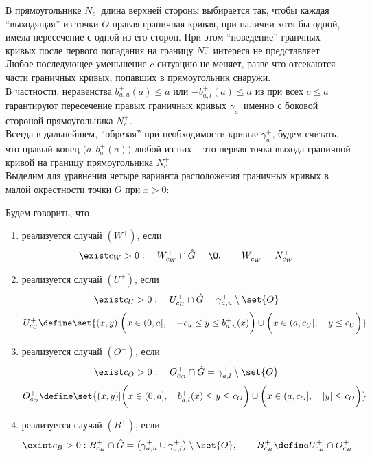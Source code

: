 В прямоугольнике $ N_c^+ $ длина верхней стороны выбирается так, чтобы каждая ``выходящая'' из точки $ O $ правая граничная кривая, при наличии хотя бы одной, имела пересечение с одной из его сторон. При этом ``поведение'' гранчных кривых после первого попадания на границу $ N_c^+ $ интереса не представляет. \\
Любое последующее уменьшение $ c $ ситуацию не меняет, разве что отсекаются части граничных кривых, попавших в прямоугольник снаружи. \\
В частности, неравенства $ b_{a, u}^+(a) \le a $ или $ -b_{a, l}^+(a) \le a $ из  при всех $ c \le a $ гарантируют пересечение правых граничных кривых $ \gamma_a^+ $ именно с боковой стороной прямоугольника $ N_c^+ $. \\
Всегда в дальнейшем, ``обрезая'' при необходимости кривые $ \gamma_a^+ $, будем считать, что правый конец $ \big( a, b_a^+(a) \big) $ любой из них -- это первая точка выхода граничной кривой на границу прямоугольника $ N_c^+ $ \\
Выделим для уравнения  четыре варианта расположения граничных кривых в малой окрестности точки $ O $ при $ x > 0 $:
\begin{definition}
	Будем говорить, что
    \begin{enumerate}
        \item реализуется случай $ (W^+) $, если
        $$ \exist c_W > 0 : \quad W_{c_W}^+ \cap \hat{G} = \O, \qquad W_{c_W}^+ = N_{c_W}^+ $$
        \item реализуется случай $ (U^+) $, если
        $$ \exist c_U > 0 : \quad U_{c_U}^+ \cap \hat{G} = \gamma_{a, u}^+ \setminus \set{O} $$
        $$ U_{c_U}^+ \define \set{(x, y) | \bigg( x \in (0, a], \quad -c_u \le y \le b_{a, u}^+(x) \bigg) \cup \bigg( x \in (a, c_U], \quad y \le c_U \bigg)} $$
        \item реализуется случай $ (O^+) $, если
        $$ \exist c_O > 0 : \quad O_{c_O}^+ \cap \hat{G} = \gamma_{a, l}^+ \setminus \set{O} $$
        $$ O_{c_O}^+ \define \set{(x, y) | \bigg( x \in (0, a], \quad b_{a, l}^+(x) \le y \le c_O \bigg) \cup \bigg( x \in (a, c_O], \quad |y| \le c_O \bigg)} $$
        \item реализуется случай $ (B^+) $, если
        $$ \exist c_B > 0 : B_{c_B}^+ \cap \hat{G} = \big( \gamma_{a, u}^+ \cup \gamma_{a, l}^+ \big) \setminus \set{O}, \qquad B_{c_B}^+ \define U_{c_B}^+ \cap O_{c_B}^+ $$
    \end{enumerate}
\end{definition}


